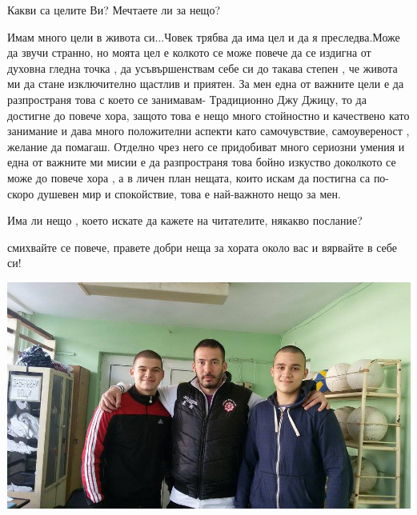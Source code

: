 \begin{multicols}{3}
Какви са целите Ви? Мечтаете ли за нещо?

Имам много цели в живота си...Човек трябва да има цел и да я преследва.Може да звучи  странно, но моята цел е колкото се може повече да се издигна от духовна гледна точка , да усъвършенствам себе си  до такава степен , че живота ми да стане изключително щастлив и приятен. За мен една от важните цели е да разпространя това с което се занимавам- Традиционно Джу Джицу, то да достигне до повече хора, защото това е нещо много  стойностно  и качествено като занимание и дава много положителни аспекти като самочувствие, самоувереност , желание да помагаш. Отделно чрез него се придобиват  много сериозни умения  и  една от важните  ми мисии е да разпространя това бойно изкуство  доколкото се може до повече хора , а в личен план нещата, които искам да постигна  са по-скоро душевен мир и спокойствие,  това е най-важното нещо за мен.

Има ли нещо , което искате да кажете на читателите, някакво послание?

смихвайте се повече, правете добри неща за хората около вас и вярвайте в себе си! 
\end{multicols}

\begin{center}
\includegraphics[width=5.7in]{./Aslan/Aslan.jpg}
\end{center}

 
\closearticle


